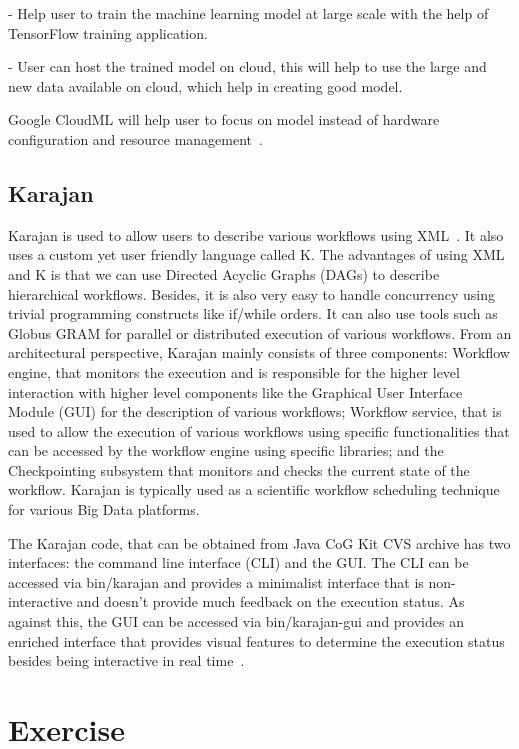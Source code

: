      - Help user to train the machine learning model at large scale
       with the help of TensorFlow  training application.
	
     - User can host the trained model on cloud,  this will help
       to use the large and new data available on cloud, which help in
       creating good model.

       Google CloudML will help user to focus on model instead of
       hardware configuration and resource
       management~\cite{www-googlecloudoverview}.

\subsection{Karajan}

Karajan is used to allow users to describe various workflows using
XML~\cite{RMBDP-Book-1}.  It also uses a custom yet user friendly
language called K.  The advantages of using XML and K is that we can
use Directed Acyclic Graphs (DAGs) to describe hierarchical workflows.
Besides, it is also very easy to handle concurrency using trivial
programming constructs like if/while orders.  It can also use tools
such as Globus GRAM for parallel or distributed execution of various
workflows.  From an architectural perspective, Karajan mainly consists
of three components: Workflow engine, that monitors the execution and
is responsible for the higher level interaction with higher level
components like the Graphical User Interface Module (GUI) for the
description of various workflows; Workflow service, that is used to
allow the execution of various workflows using specific
functionalities that can be accessed by the workflow engine using
specific libraries; and the Checkpointing subsystem that monitors and
checks the current state of the workflow.  Karajan is typically used
as a scientific workflow scheduling technique for various Big Data
platforms.

The Karajan code, that can be obtained from Java CoG Kit CVS archive
has two interfaces: the command line interface (CLI) and the GUI.  The
CLI can be accessed via bin/karajan and provides a minimalist
interface that is non-interactive and doesn't provide much feedback on
the execution status.  As against this, the GUI can be accessed via
bin/karajan-gui and provides an enriched interface that provides
visual features to determine the execution status besides being
interactive in real time~\cite{Karajan-interfaces}.


\section{Exercise}

